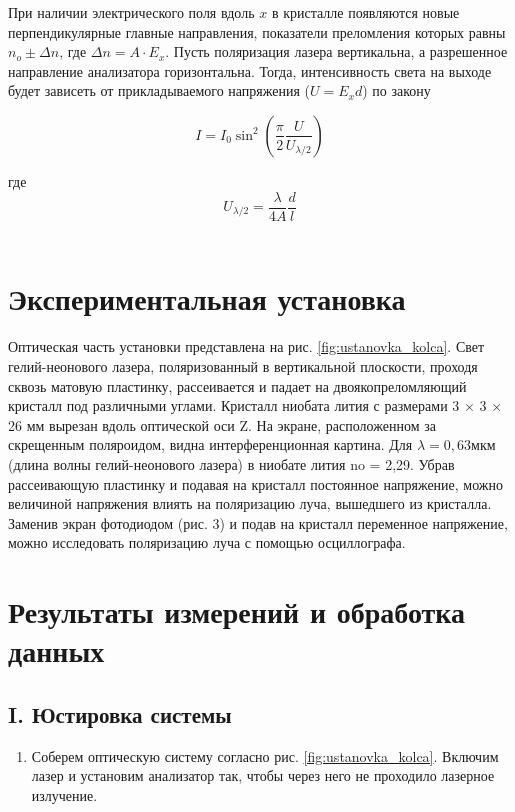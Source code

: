 \documentclass[a4paper,12pt]{article}
\begin{document}
При наличии электрического поля вдоль $x$ в кристалле появляются новые перпендикулярные
главные направления, показатели преломления которых равны $n_o \pm \Delta n$, где
$\Delta n = A \cdot E_{x}$. Пусть поляризация лазера вертикальна, а разрешенное
направление анализатора горизонтальна. Тогда, интенсивность света на выходе
будет зависеть от прикладываемого напряжения ($U = E_x d$) по закону

\begin{equation}
    I = I_0 \sin^2\left(\frac{\pi}{2}\frac{U}{U_{\lambda/2}}\right)
    \label{eq:pokkels}
\end{equation}

где
\begin{equation}
    U_{\lambda/2} = \frac{\lambda}{4A} \frac{d}{l}
    \label{eq:poluvolnovoe_napryajenie}
\end{equation}
\\


\section{Экспериментальная установка}

Оптическая часть установки представлена на рис. \ref{fig:ustanovka_kolca}. Свет гелий-неонового лазера, поляризованный в вертикальной плоскости, проходя сквозь матовую пластинку, рассеивается и падает на двоякопреломляющий кристалл под различными углами. Кристалл ниобата лития с размерами 3 × 3 × 26 мм вырезан вдоль оптической оси Z. На экране, расположенном за скрещенным поляроидом, видна интерференционная картина. Для $\lambda = 0,63 мкм$ (длина волны гелий-неонового лазера) в ниобате лития no = 2,29. Убрав рассеивающую пластинку и подавая на кристалл постоянное напряжение, можно величиной напряжения влиять на поляризацию луча, вышедшего из кристалла. Заменив экран фотодиодом (рис. 3) и подав на кристалл переменное напряжение, можно исследовать поляризацию луча с помощью осциллографа.

\section{Результаты измерений и обработка данных}

\subsection*{I. Юстировка системы}

\begin{enumerate}
    \item Соберем оптическую систему согласно рис. \ref{fig:ustanovka_kolca}. Включим лазер и установим анализатор так, чтобы через него не проходило лазерное излучение.
\end{enumerate}
\end{document}
